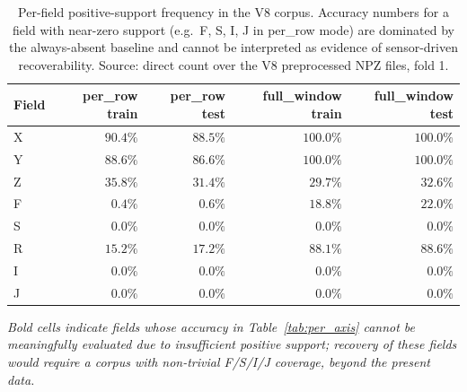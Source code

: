 \begin{table}[ht]
\centering
\caption{Per-field positive-support frequency in the V8 corpus. Accuracy numbers for a field with near-zero support (e.g.\ F, S, I, J in per\_row mode) are dominated by the always-absent baseline and cannot be interpreted as evidence of sensor-driven recoverability. Source: direct count over the V8 preprocessed NPZ files, fold 1.}
\label{tab:data_coverage}
\begin{tabular}{l r r r r}
\toprule
Field & per\_row train & per\_row test & full\_window train & full\_window test \\
\midrule
X  & $90.4\%$           & $88.5\%$           & $100.0\%$          & $100.0\%$          \\
Y  & $88.6\%$           & $86.6\%$           & $100.0\%$          & $100.0\%$          \\
Z  & $35.8\%$           & $31.4\%$           & $29.7\%$           & $32.6\%$           \\
F  & $\mathbf{0.4\%}$   & $\mathbf{0.6\%}$   & $18.8\%$           & $22.0\%$           \\
S  & $\mathbf{0.0\%}$   & $\mathbf{0.0\%}$   & $\mathbf{0.0\%}$   & $\mathbf{0.0\%}$   \\
R  & $15.2\%$           & $17.2\%$           & $88.1\%$           & $88.6\%$           \\
I  & $\mathbf{0.0\%}$   & $\mathbf{0.0\%}$   & $\mathbf{0.0\%}$   & $\mathbf{0.0\%}$   \\
J  & $\mathbf{0.0\%}$   & $\mathbf{0.0\%}$   & $\mathbf{0.0\%}$   & $\mathbf{0.0\%}$   \\
\bottomrule
\end{tabular}
\par\smallskip
\footnotesize\textit{Bold cells indicate fields whose accuracy in Table~\ref{tab:per_axis} cannot be meaningfully evaluated due to insufficient positive support; recovery of these fields would require a corpus with non-trivial F/S/I/J coverage, beyond the present data.}
\end{table}
